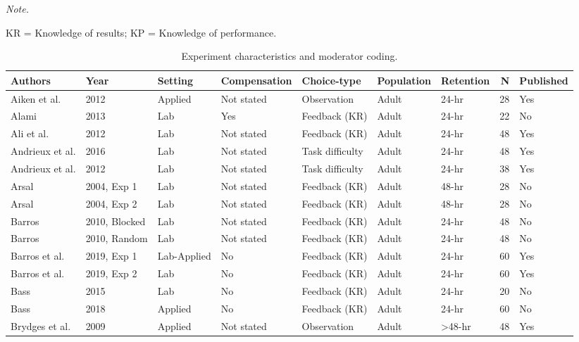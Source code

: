 \documentclass[
  english,
  man, donotrepeattitle,floatsintext]{apa7}
\begin{document}
\begin{landscape}
\begin{ThreePartTable}
\begin{TableNotes}
\item \textit{Note.} 
\item KR = Knowledge of results; KP = Knowledge of performance.
\end{TableNotes}
\begin{longtable}[l]{lllllllrl}
\caption{\label{tab:table1}Experiment characteristics and moderator coding.}\\
\toprule
Authors & Year & Setting & Compensation & Choice-type & Population & Retention & N & Published\\
\midrule
Aiken et al. & 2012 & Applied & Not stated & Observation & Adult & 24-hr & 28 & Yes\\
\addlinespace
Alami & 2013 & Lab & Yes & Feedback (KR) & Adult & 24-hr & 22 & No\\
\addlinespace
Ali et al. & 2012 & Lab & Not stated & Feedback (KR) & Adult & 24-hr & 48 & Yes\\
\addlinespace
Andrieux et al. & 2016 & Lab & Not stated & Task difficulty & Adult & 24-hr & 48 & Yes\\
\addlinespace
Andrieux et al. & 2012 & Lab & Not stated & Task difficulty & Adult & 24-hr & 38 & Yes\\
\addlinespace
Arsal & 2004, Exp 1 & Lab & Not stated & Feedback (KR) & Adult & 48-hr & 28 & No\\
\addlinespace
Arsal & 2004, Exp 2 & Lab & Not stated & Feedback (KR) & Adult & 48-hr & 28 & No\\
\addlinespace
Barros & 2010, Blocked & Lab & Not stated & Feedback (KR) & Adult & 24-hr & 48 & No\\
\addlinespace
Barros & 2010, Random & Lab & Not stated & Feedback (KR) & Adult & 24-hr & 48 & No\\
\addlinespace
Barros et al. & 2019, Exp 1 & Lab-Applied & No & Feedback (KR) & Adult & 24-hr & 60 & Yes\\
\addlinespace
Barros et al. & 2019, Exp 2 & Lab & No & Feedback (KR) & Adult & 24-hr & 60 & Yes\\
\addlinespace
Bass & 2015 & Lab & No & Feedback (KR) & Adult & 24-hr & 20 & No\\
\addlinespace
Bass & 2018 & Applied & No & Feedback (KR) & Adult & 24-hr & 60 & No\\
\addlinespace
Brydges et al. & 2009 & Applied & Not stated & Observation & Adult & >48-hr & 48 & Yes\\

\end{longtable}
\end{ThreePartTable}
\end{landscape}
\end{document}
